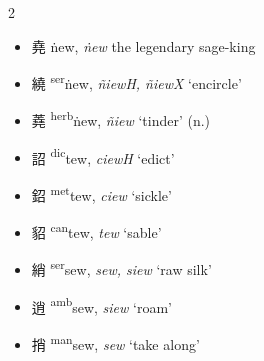 \begin{multicols}{2}
\raggedcolumns

\begin{itemize}

    \item {\Large{堯}} %
    {\large{ṅew}},
    \textit{ṅew} the legendary sage-king        %

    \item {\Large{繞}} %
    {\large{{\textsuperscript{ser}}ṅew}},
    \textit{ñiewH, ñiewX} `encircle'        %

    \item {\Large{蕘}} %
    {\large{{\textsuperscript{herb}}ṅew}},
    \textit{ñiew} `tinder' (n.)        %

\end{itemize}

\medskip

\begin{itemize}

    \item {\Large{詔}} %
    {\large{{\textsuperscript{dic}}tew}},
    \textit{ciewH} `edict'        %

    \item {\Large{鉊}} %
    {\large{{\textsuperscript{met}}tew}},
    \textit{ciew} `sickle'        %

    \item {\Large{貂}} %
    {\large{{\textsuperscript{can}}tew}},
    \textit{tew} `sable'        %

\end{itemize}

\medskip

\begin{minipage}{\columnwidth}
\begin{itemize}[leftmargin=*, labelsep=0.5em]
    \item {\Large{綃}} %
    {\large{{\textsuperscript{ser}}sew}},
    \textit{sew, siew} `raw silk'        %

    \item {\Large{逍}} %
    {\large{{\textsuperscript{amb}}sew}},
    \textit{siew} `roam'        %

    \item {\Large{捎}} %
    {\large{{\textsuperscript{man}}sew}},
    \textit{sew} `take along'        %


\end{itemize}
\end{minipage}
\end{multicols}
